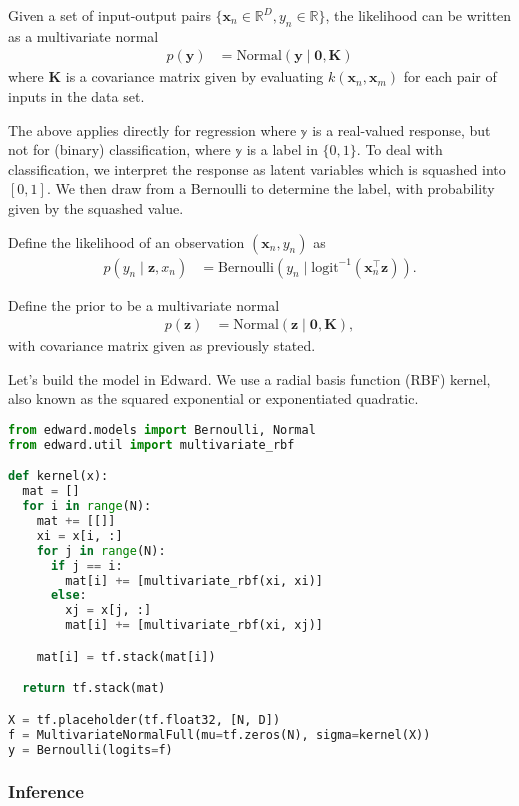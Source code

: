 Given a set of input-output pairs
$\{\mathbf{x}_n\in\mathbb{R}^D,y_n\in\mathbb{R}\}$,
the likelihood can be written as a multivariate normal
\begin{align*}
  p(\mathbf{y})
  &=
  \text{Normal}(\mathbf{y} \mid \mathbf{0}, \mathbf{K})
\end{align*}
where $\mathbf{K}$ is a covariance matrix given by evaluating
$k(\mathbf{x}_n, \mathbf{x}_m)$ for each pair of inputs in the data
set.

The above applies directly for regression where $\mathbb{y}$ is a
real-valued response, but not for (binary) classification, where $\mathbb{y}$
is a label in $\{0,1\}$. To deal with classification, we interpret the
response as latent variables which is squashed into $[0,1]$. We then
draw from a Bernoulli to determine the label, with probability given
by the squashed value.

Define the likelihood of an observation $(\mathbf{x}_n, y_n)$ as
\begin{align*}
  p(y_n \mid \mathbf{z}, x_n)
  &=
  \text{Bernoulli}(y_n \mid \text{logit}^{-1}(\mathbf{x}_n^\top \mathbf{z})).
\end{align*}

Define the prior to be a multivariate normal
\begin{align*}
  p(\mathbf{z})
  &=
  \text{Normal}(\mathbf{z} \mid \mathbf{0}, \mathbf{K}),
\end{align*}
with covariance matrix given as previously stated.

Let's build the model in Edward. We use a radial basis function (RBF)
kernel, also known as the squared exponential or exponentiated
quadratic.
\begin{lstlisting}[language=Python]
from edward.models import Bernoulli, Normal
from edward.util import multivariate_rbf

def kernel(x):
  mat = []
  for i in range(N):
    mat += [[]]
    xi = x[i, :]
    for j in range(N):
      if j == i:
        mat[i] += [multivariate_rbf(xi, xi)]
      else:
        xj = x[j, :]
        mat[i] += [multivariate_rbf(xi, xj)]

    mat[i] = tf.stack(mat[i])

  return tf.stack(mat)

X = tf.placeholder(tf.float32, [N, D])
f = MultivariateNormalFull(mu=tf.zeros(N), sigma=kernel(X))
y = Bernoulli(logits=f)
\end{lstlisting}

\subsubsection{Inference}

